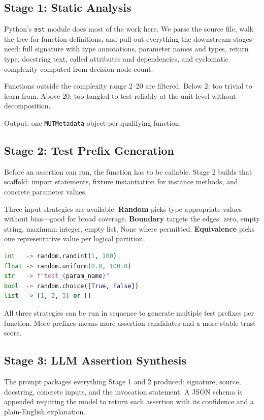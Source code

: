 \documentclass[conference]{IEEEtran}
\begin{document}
\subsection{Stage 1: Static Analysis}

Python's \texttt{ast} module does most of the work here. We parse the source file, walk the tree for function definitions, and pull out everything the downstream stages need: full signature with type annotations, parameter names and types, return type, docstring text, called attributes and dependencies, and cyclomatic complexity computed from decision-node count.

Functions outside the complexity range 2--20 are filtered. Below 2: too trivial to learn from. Above 20: too tangled to test reliably at the unit level without decomposition.

Output: one \texttt{MUTMetadata} object per qualifying function.

\subsection{Stage 2: Test Prefix Generation}

Before an assertion can run, the function has to be callable. Stage 2 builds that scaffold: import statements, fixture instantiation for instance methods, and concrete parameter values.

Three input strategies are available. \textbf{Random} picks type-appropriate values without bias—good for broad coverage. \textbf{Boundary} targets the edges: zero, empty string, maximum integer, empty list, None where permitted. \textbf{Equivalence} picks one representative value per logical partition.

\begin{lstlisting}[language=Python]
int   -> random.randint(1, 100)
float -> random.uniform(0.0, 100.0)
str   -> f"test_{param_name}"
bool  -> random.choice([True, False])
list  -> [1, 2, 3] or []
\end{lstlisting}

All three strategies can be run in sequence to generate multiple test prefixes per function. More prefixes means more assertion candidates and a more stable trust score.

\subsection{Stage 3: LLM Assertion Synthesis}

The prompt packages everything Stage 1 and 2 produced: signature, source, docstring, concrete inputs, and the invocation statement. A JSON schema is appended requiring the model to return each assertion with its confidence and a plain-English explanation.
\end{document}
